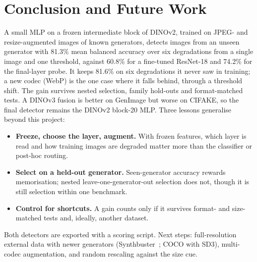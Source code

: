 \documentclass[10pt,a4paper]{article}
\begin{document}
\section{Conclusion and Future Work}\label{sec:conclusion}
A small MLP on a frozen intermediate block of DINOv2, trained on JPEG- and resize-augmented images of known generators, detects images from an unseen generator with 81.3\% mean balanced accuracy over six degradations from a single image and one threshold, against 60.8\% for a fine-tuned ResNet-18 and 74.2\% for the final-layer probe. It keeps 81.6\% on six degradations it never saw in training; a new codec (WebP) is the one case where it falls behind, through a threshold shift. The gain survives nested selection, family hold-outs and format-matched tests. A DINOv3 fusion is better on GenImage but worse on CIFAKE, so the final detector remains the DINOv2 block-20 MLP. Three lessons generalise beyond this project:
\begin{itemize}
  \item \textbf{Freeze, choose the layer, augment.} With frozen features, which layer is read and how training images are degraded matter more than the classifier or post-hoc routing.
  \item \textbf{Select on a held-out generator.} Seen-generator accuracy rewards memorisation; nested leave-one-generator-out selection does not, though it is still selection within one benchmark.
  \item \textbf{Control for shortcuts.} A gain counts only if it survives format- and size-matched tests and, ideally, another dataset.
\end{itemize}
Both detectors are exported with a scoring script. Next steps: full-resolution external data with newer generators (Synthbuster~\cite{bammey2023synthbuster}; COCO with SD3), multi-codec augmentation, and random rescaling against the size cue.
\end{document}
